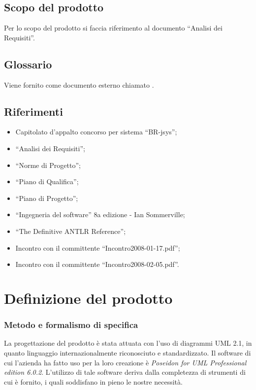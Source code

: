 \documentclass[11pt,titlepage,a4paper]{report}
\begin{document}
\section{Scopo del prodotto}
Per lo scopo del prodotto si faccia riferimento al documento ``Analisi dei Requisiti''.
\section{Glossario}
Viene fornito come documento esterno chiamato \Glossario .
\section{Riferimenti}
\begin{itemize}
\item Capitolato d'appalto concorso per sistema ``BR-jsys'';
\item ``Analisi dei Requisiti'';
\item ``Norme di Progetto'';
\item ``Piano di Qualifica'';
\item ``Piano di Progetto'';
\item ``Ingegneria del software'' 8a edizione - Ian Sommerville;
\item ``The Definitive ANTLR Reference'';
\item Incontro con il committente ``Incontro2008-01-17.pdf'';
\item Incontro con il committente ``Incontro2008-02-05.pdf''.
\end{itemize}


\chapter{Definizione del prodotto}
\subsection{Metodo e formalismo di specifica}
La progettazione del prodotto \`e stata attuata con l'uso di diagrammi UML 2.1, in quanto linguaggio internazionalmente riconosciuto e standardizzato.
Il software di cui l'azienda ha fatto uso per la loro creazione \`e \textit{Poseidon for UML Professional edition 6.0.2}. L'utilizzo di tale software deriva dalla completezza
di strumenti di cui \`e fornito, i quali soddisfano in pieno le nostre necessit\`a.
\end{document}
